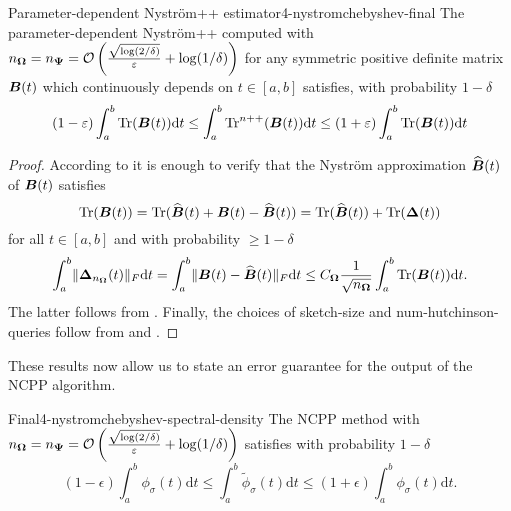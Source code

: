 \begin{theorem}{Parameter-dependent Nystr\"om++ estimator}{4-nystromchebyshev-final}
    The parameter-dependent Nystr\"om++ computed with
    $n_{\boldsymbol{\Omega}} = n_{\boldsymbol{\Psi}} = \mathcal{O}\left( \frac{\sqrt{\log(2/\delta)}}{\varepsilon} + \log(1/\delta) \right)$
    for any symmetric positive definite matrix $\boldsymbol{B}(t)$ which continuously
    depends on $t \in [a, b]$ satisfies, with probability
    $1 - \delta$
    \begin{equation}
        (1 - \varepsilon) \int_{a}^{b}\operatorname{Tr}(\boldsymbol{B}(t)) \mathrm{d}t \leq \int_{a}^{b}\operatorname{Tr}^{n++}(\boldsymbol{B}(t)) \mathrm{d}t \leq  (1 + \varepsilon) \int_{a}^{b}\operatorname{Tr}(\boldsymbol{B}(t)) \mathrm{d}t
    \end{equation}
\end{theorem}

\begin{proof}
    According to  it is enough to verify that the Nystr\"om approximation $\widehat{\boldsymbol{B}}(t)$ of $\boldsymbol{B}(t)$ satisfies
    \begin{equation}
        \operatorname{Tr}(\boldsymbol{B}(t)) = \operatorname{Tr}(\widehat{\boldsymbol{B}}(t) + \boldsymbol{B}(t) - \widehat{\boldsymbol{B}}(t)) = \operatorname{Tr}(\widehat{\boldsymbol{B}}(t)) + \operatorname{Tr}(\boldsymbol{\Delta}(t))
    \end{equation}
    for all $t \in [a, b]$ and with probability $\geq 1 - \delta$
    \begin{equation}
        \int_{a}^{b} \lVert \boldsymbol{\Delta}_{n_{\boldsymbol{\Omega}}}(t) \rVert _F \mathrm{d}t = \int_{a}^{b} \lVert \boldsymbol{B}(t) - \widehat{\boldsymbol{B}}(t) \rVert _F \mathrm{d}t \leq C_{\boldsymbol{\Omega}} \frac{1}{\sqrt{n_{\boldsymbol{\Omega}}}} \int_{a}^{b} \operatorname{Tr}(\boldsymbol{B}(t)) \mathrm{d}t.
    \end{equation}
    The latter follows from . Finally, the choices of \gls{sketch-size} and \gls{num-hutchinson-queries} follow from  and .
\end{proof}

These results now allow us to state an error guarantee for the output of the
\gls{NCPP} algorithm.
\begin{theorem}{Final}{4-nystromchebyshev-spectral-density}
    The \gls{NCPP} method with $n_{\boldsymbol{\Omega}} = n_{\boldsymbol{\Psi}} = \mathcal{O}\left( \frac{\sqrt{\log(2/\delta)}}{\varepsilon} + \log(1/\delta) \right)$
     satisfies with probability $1 - \delta$
    \begin{equation}
        (1 - \epsilon) \int_{a}^{b} \phi_{\sigma}(t) \mathrm{d}t \leq \int_{a}^{b} \widetilde{\phi}_{\sigma}(t) \mathrm{d}t \leq (1 + \epsilon) \int_{a}^{b} \phi_{\sigma}(t) \mathrm{d}t.
    \end{equation}
\end{theorem}


